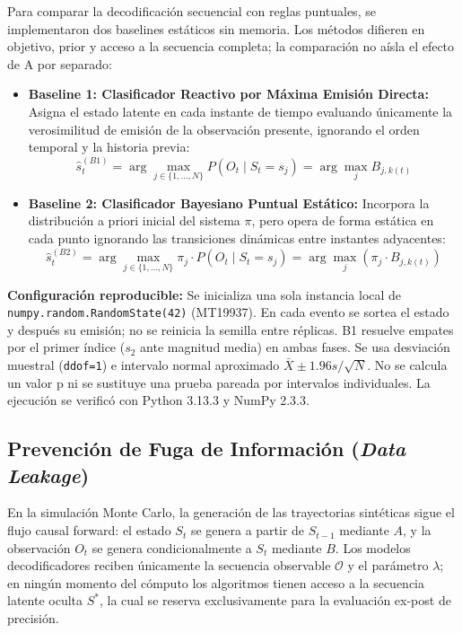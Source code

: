 \documentclass[11pt,a4paper]{article}
\begin{document}
Para comparar la decodificación secuencial con reglas puntuales, se implementaron dos baselines estáticos sin memoria. Los métodos difieren en objetivo, prior y acceso a la secuencia completa; la comparación no aísla el efecto de A por separado:

\begin{itemize}
    \item \textbf{Baseline 1: Clasificador Reactivo por Máxima Emisión Directa:}
    Asigna el estado latente en cada instante de tiempo evaluando únicamente la verosimilitud de emisión de la observación presente, ignorando el orden temporal y la historia previa:
    \begin{equation}
    \hat{s}_t^{(B1)} = \arg\max_{j \in \{1, \dots, N\}} P(O_t \mid S_t = s_j) = \arg\max_{j} B_{j, k(t)}
    \end{equation}
    \item \textbf{Baseline 2: Clasificador Bayesiano Puntual Estático:}
    Incorpora la distribución a priori inicial del sistema $\pi$, pero opera de forma estática en cada punto ignorando las transiciones dinámicas entre instantes adyacentes:
    \begin{equation}
    \hat{s}_t^{(B2)} = \arg\max_{j \in \{1, \dots, N\}} \pi_j \cdot P(O_t \mid S_t = s_j) = \arg\max_{j} \left( \pi_j \cdot B_{j, k(t)} \right)
    \end{equation}
\end{itemize}

\noindent \textbf{Configuración reproducible:} Se inicializa una sola instancia local de \texttt{numpy.random.RandomState(42)} (MT19937). En cada evento se sortea el estado y después su emisión; no se reinicia la semilla entre réplicas. B1 resuelve empates por el primer índice ($s_2$ ante magnitud media) en ambas fases. Se usa desviación muestral (\texttt{ddof=1}) e intervalo normal aproximado $\bar{X}\pm1.96s/\sqrt{N}$. No se calcula un valor p ni se sustituye una prueba pareada por intervalos individuales. La ejecución se verificó con Python 3.13.3 y NumPy 2.3.3.

\subsection{Prevención de Fuga de Información (\textit{Data Leakage})}

En la simulación Monte Carlo, la generación de las trayectorias sintéticas sigue el flujo causal forward: el estado $S_t$ se genera a partir de $S_{t-1}$ mediante $A$, y la observación $O_t$ se genera condicionalmente a $S_t$ mediante $B$. Los modelos decodificadores reciben únicamente la secuencia observable $\mathcal{O}$ y el parámetro $\lambda$; en ningún momento del cómputo los algoritmos tienen acceso a la secuencia latente oculta $S^*$, la cual se reserva exclusivamente para la evaluación ex-post de precisión.
\end{document}
